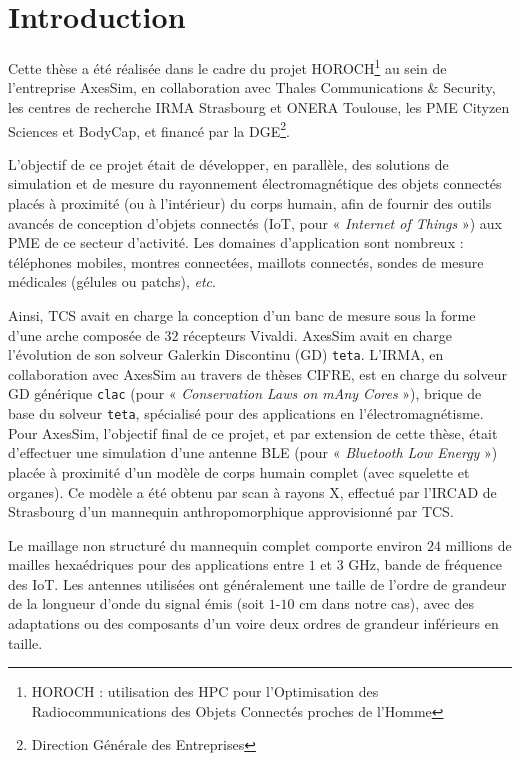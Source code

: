 \chapter*{Introduction}


Cette thèse a été réalisée dans le cadre du projet HOROCH\footnote{HOROCH : utilisation des HPC pour l'Optimisation des Radiocommunications
des Objets Connectés proches de l'Homme}
au sein de l'entreprise AxesSim, en collaboration avec
Thales Communications \& Security, les centres de recherche
IRMA Strasbourg et ONERA Toulouse, les PME Cityzen Sciences et BodyCap,
et financé par la DGE\footnote{Direction Générale des Entreprises}.

L'objectif de ce projet était de développer, en parallèle,
des solutions de simulation et de mesure du rayonnement
électromagnétique des objets connectés placés à proximité
(ou à l'intérieur) du corps humain, afin de fournir des outils avancés
de conception d'objets connectés (IoT, pour « \textit{Internet of Things} »)
aux PME de ce secteur d'activité.
Les domaines d'application sont nombreux : téléphones mobiles,
montres connectées, maillots connectés, sondes de mesure médicales
(gélules ou patchs), \textit{etc}.

Ainsi, TCS avait en charge la conception d'un banc de mesure
sous la forme d'une arche composée de $32$ récepteurs Vivaldi.
AxesSim avait en charge l'évolution de son solveur
Galerkin Discontinu (GD) \texttt{teta}.
L'IRMA, en collaboration avec AxesSim au travers de thèses CIFRE,
est en charge du solveur GD générique \texttt{clac}
(pour « \textit{Conservation Laws on mAny Cores} »),
brique de base du solveur \texttt{teta}, spécialisé pour
des applications en l'électromagnétisme.
\\


Pour AxesSim, l'objectif final de ce projet,
et par extension de cette thèse, était d'effectuer une simulation
d'une antenne BLE (pour « \textit{Bluetooth Low Energy} ») placée
à proximité d'un modèle de corps humain complet (avec squelette et organes). Ce modèle a été obtenu par scan à rayons X,
effectué par l'IRCAD de Strasbourg d'un mannequin anthropomorphique
approvisionné par TCS.

Le maillage non structuré du mannequin complet comporte
environ $24$ millions de mailles hexaédriques
pour des applications entre $1$ et $3$ GHz, bande de fréquence des IoT.
Les antennes utilisées ont généralement une taille de l'ordre de grandeur
de la longueur d'onde du signal émis (soit $1$-$10$ cm dans notre cas),
avec des adaptations ou des composants d'un voire deux ordres de grandeur
inférieurs en taille.

